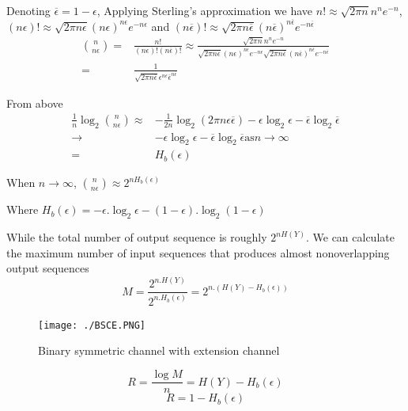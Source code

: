 \documentclass[a4paper, 13pt]{report}
\begin{document}
\par Denoting $\overline{\epsilon}=1-\epsilon$, Applying Sterling's approximation we have $n!\approx\sqrt{2\pi n}n^ne^{-n}$, $(n\epsilon)!\approx\sqrt{2\pi n\epsilon}(n\epsilon)^{n\epsilon}e^{-n\epsilon}$ and $(n\overline{\epsilon})!\approx\sqrt{2\pi n\overline{\epsilon}}(n\overline{\epsilon})^{n\overline{\epsilon}}e^{-n\overline{\epsilon}}$
\begin{equation}
    \begin{split}
    \binom{n}{n\epsilon} = &\frac{n!}{(n\epsilon)!(n\overline{\epsilon})!}
    \approx \frac{\sqrt{2\pi n}n^ne^{-n}}{\sqrt{2\pi n\epsilon}(n\epsilon)^{n\epsilon}e^{-n\epsilon}\sqrt{2\pi n\overline{\epsilon}}(n\overline{\epsilon})^{n\overline{\epsilon}}e^{-n\overline{\epsilon}}}\\
    = &\frac{1}{\sqrt{2\pi n\overline{\epsilon}}\epsilon^{n\epsilon}\overline{\epsilon}^{n\overline{\epsilon}}}
    \end{split}
\end{equation}
\par From above
\begin{equation}
    \begin{split}
    \frac{1}{n}\log_{2}\binom{n}{n\epsilon} \approx & -\frac{1}{2n}\log_{2}(2\pi n\epsilon\overline{\epsilon})-\epsilon\log_{2}\epsilon - \overline{\epsilon}\log_{2}\overline{\epsilon}\\
    \rightarrow & -\epsilon\log_{2}\epsilon - \overline{\epsilon}\log_{2}\overline{\epsilon} \text{as} n \rightarrow \infty\\
    = & H_b(\epsilon)
    \end{split}
\end{equation}
\par When $n\rightarrow\infty$, $\binom{n}{n\epsilon}\approx2^{nH_b(\epsilon)}$
\par Where $H_b(\epsilon) = -\epsilon.\log_{2}\epsilon-(1-\epsilon).\log_{2}(1-\epsilon)$
\par While the total number of output sequence is roughly $2^{nH(Y)}$. We can calculate the maximum number of input sequences that produces almost nonoverlapping output sequences
\begin{equation}
    M = \frac{2^{n.H(Y)}}{2^{n.H_b(\epsilon)}} = 2^{n.(H(Y)-H_b(\epsilon))}
\end{equation}
\begin{figure}[H]  %
    \centering
    \texttt{[image: ./BSCE.PNG]}
    \caption{Binary symmetric channel with extension channel}
    \label{fig:bsce}
\end{figure}
\begin{equation}
    R = \frac{\log M}{n} = H(Y) - H_b(\epsilon)
\end{equation}
\begin{equation}
    R = 1 - H_b(\epsilon)
\end{equation}
\end{document}
